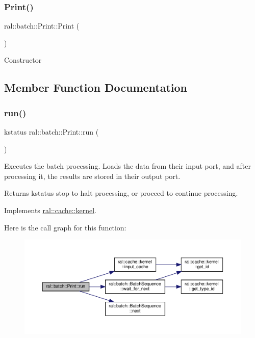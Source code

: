 \subsubsection{\texorpdfstring{Print()}{Print()}}
{\footnotesize\ttfamily ral\+::batch\+::\+Print\+::\+Print (\begin{DoxyParamCaption}{ }\end{DoxyParamCaption})\hspace{0.3cm}{\ttfamily [inline]}}

Constructor 

\subsection{Member Function Documentation}
\mbox{\label{classral_1_1batch_1_1Print_aaa9c9b3999fa088344f8505fcf201721}} 
\subsubsection{\texorpdfstring{run()}{run()}}
{\footnotesize\ttfamily kstatus ral\+::batch\+::\+Print\+::run (\begin{DoxyParamCaption}{ }\end{DoxyParamCaption})\hspace{0.3cm}{\ttfamily [virtual]}}

Executes the batch processing. Loads the data from their input port, and after processing it, the results are stored in their output port. \begin{DoxyReturn}{Returns}
kstatus \textquotesingle{}stop\textquotesingle{} to halt processing, or \textquotesingle{}proceed\textquotesingle{} to continue processing. 
\end{DoxyReturn}


Implements \hyperlink{classral_1_1cache_1_1kernel_a735b081cccae9574924e74ea6d293ef7}{ral\+::cache\+::kernel}.

Here is the call graph for this function\+:\nopagebreak
\begin{figure}[H]
\begin{center}
\leavevmode
\includegraphics[width=350pt]{classral_1_1batch_1_1Print_aaa9c9b3999fa088344f8505fcf201721_cgraph}
\end{center}
\end{figure}


